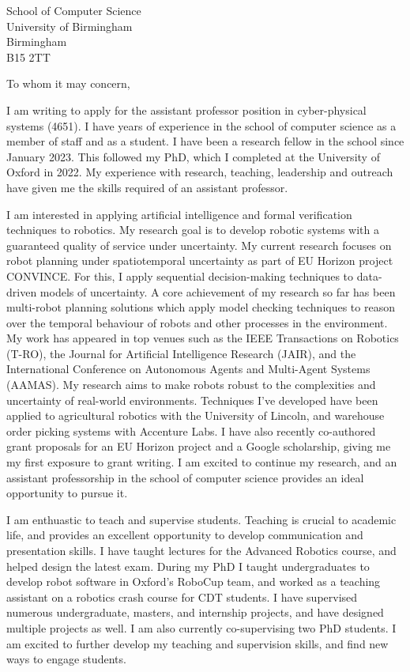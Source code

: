 \documentclass[12pt]{letter}
\begin{document}
\begin{letter}{School of Computer Science \\ University of Birmingham \\ Birmingham \\ B15 2TT}
\opening{To whom it may concern,}


I am writing to apply for the assistant professor position in cyber-physical systems (4651).
%
I have years of experience in the school of computer science as a member of staff and as a student.
%
I have been a research fellow in the school since January 2023.
%
This followed my PhD, which I completed at the University of Oxford in 2022.
%
My experience with research, teaching, leadership and outreach have given me the skills required of an assistant professor.



I am interested in applying artificial intelligence and formal verification techniques to robotics.
%
My research goal is to develop robotic systems with a guaranteed quality of service under uncertainty.
%
My current research focuses on robot planning under spatiotemporal uncertainty as part of EU Horizon project CONVINCE.
%
For this, I apply sequential decision-making techniques to data-driven models of uncertainty.
%
A core achievement of my research so far has been multi-robot planning solutions which apply model checking techniques to reason over the temporal behaviour of robots and other processes in the environment.
%
My work has appeared in top venues such as the IEEE Transactions on Robotics (T-RO), the Journal for Artificial Intelligence Research (JAIR), and the International Conference on Autonomous Agents and Multi-Agent Systems (AAMAS).
%
My research aims to make robots robust to the complexities and uncertainty of real-world environments.
%
Techniques I've developed have been applied to agricultural robotics with the University of Lincoln, and warehouse order picking systems with Accenture Labs.
%
I have also recently co-authored grant proposals for an EU Horizon project and a Google scholarship, giving me my first exposure to grant writing.
%
I am excited to continue my research, and an assistant professorship in the school of computer science provides an ideal opportunity to pursue it.

I am enthuastic to teach and supervise students.
%
Teaching is crucial to academic life, and provides an excellent opportunity to develop communication and presentation skills.
%
I have taught lectures for the Advanced Robotics course, and helped design the latest exam.
%
During my PhD I taught undergraduates to develop robot software in Oxford's RoboCup team, and worked as a teaching assistant on a robotics crash course for CDT students.
%
I have supervised numerous undergraduate, masters, and internship projects, and have designed multiple projects as well.
%
I am also currently co-supervising two PhD students.
%
I am excited to further develop my teaching and supervision skills, and find new ways to engage students.


\end{letter}
\end{document}

